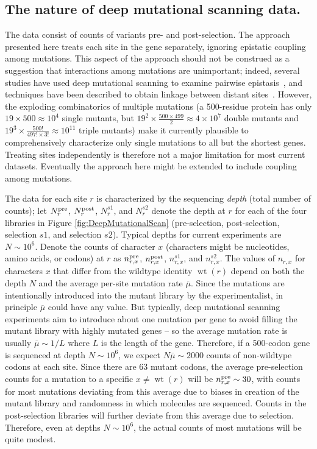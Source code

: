 \documentclass[twocolumn]{bmcart}%
\begin{document}
\subsection*{The nature of deep mutational scanning data.}
The data consist of counts of variants pre- and post-selection. The approach presented here treats each site in the gene separately, ignoring epistatic coupling among mutations. This aspect of the approach should not be construed as a suggestion that interactions among mutations are unimportant; indeed, several studies have used deep mutational scanning to examine pairwise epistasis~\cite{olson2014comprehensive,araya2012fundamental,bank2015systematic}, and techniques have been described to obtain linkage between distant sites~\cite{hiatt2010parallel,wu2014hiv}. However, the exploding combinatorics of multiple mutations (a 500-residue protein has only $19 \times 500 \approx 10^4$ single mutants, but $19^2 \times \frac{500 \times 499}{2} \approx 4 \times 10^7$  double mutants and $19^3 \times \frac{500!}{497! \times 3!} \approx 10^{11}$ triple mutants) make it currently plausible to comprehensively characterize only single mutations to all but the shortest genes. Treating sites independently is therefore not a major limitation for most current datasets. Eventually the approach here might be extended to include coupling among mutations.

The data for each site $r$ is characterized by the sequencing \emph{depth} (total number of counts); let $N_r^{\rm{pre}}$, $N_r^{\rm{post}}$, $N_r^{s1}$, and $N_r^{s2}$ denote the depth at $r$ for each of the four libraries in Figure \ref{fig:DeepMutationalScan} (pre-selection, post-selection, selection $s1$, and selection $s2$). Typical depths for current experiments are $N \sim 10^6$. Denote the counts of character $x$ (characters might be nucleotides, amino acids, or codons) at $r$ as $n_{r,x}^{\rm{pre}}$, $n_{r,x}^{\rm{post}}$, $n_{r,x}^{s1}$, and $n_{r,x}^{s2}$. The values of $n_{r,x}$ for characters $x$ that differ from the wildtype identity $\operatorname{wt}\left(r\right)$ depend on both the depth $N$ and the average per-site mutation rate $\overline{\mu}$. Since the mutations are intentionally introduced into the mutant library by the experimentalist, in principle $\overline{\mu}$ could have any value. But typically, deep mutational scanning experiments aim to introduce about one mutation per gene to avoid filling the mutant library with highly mutated genes -- so the average mutation rate is usually $\overline{\mu} \sim 1/L$ where $L$ is the length of the gene. Therefore, if a 500-codon gene is sequenced at depth $N \sim 10^6$, we expect $N \overline{\mu} \sim 2000$ counts of non-wildtype codons at each site. Since there are 63 mutant codons, the average pre-selection counts for a mutation to a specific $x \ne \operatorname{wt}\left(r\right)$ will be $n_{r,x}^{\rm{pre}} \sim 30$, with counts for most mutations deviating from this average due to biases in creation of the mutant library and randomness in which molecules are sequenced. Counts in the post-selection libraries will further deviate from this average due to selection. Therefore, even at depths $N \sim 10^6$, the actual counts of most mutations will be quite modest.
\end{document}
